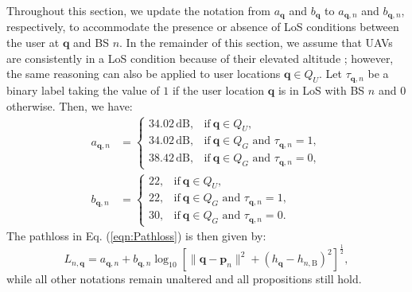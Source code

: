 Throughout this section, we update the notation from $a_{\bm{q}}$ and $b_{\bm{q}}$ to $a_{\bm{q}, n}$ and $b_{\bm{q}, n}$, respectively, to accommodate the presence or absence of LoS conditions between the user at $\bm{q}$ and BS $n$. In the remainder of this section, we assume that UAVs are consistently in a LoS condition because of their elevated altitude \cite{3GPP36777}; however, the same reasoning can also be applied to user locations $\bm{q} \in Q_U$. Let $\tau_{\bm{q}, n}$ be a binary label taking the value of $1$ if the user location $\bm{q}$ is in LoS with BS $n$ and $0$ otherwise. Then, we have: 
\begin{align}\label{a_qn_values}
a_{\bm{q},n} &=
\begin{cases}
34.02\,\textrm{dB}, & \text{if}\ \bm{q}\in Q_U, \\
34.02\,\textrm{dB}, & \text{if}\ \bm{q}\in Q_G \text{ and } \tau_{\bm{q},n} = 1, \\
38.42\,\textrm{dB}, & \text{if}\ \bm{q}\in Q_G \text{ and } \tau_{\bm{q},n} = 0,
\end{cases}
\\
b_{\bm{q},n} &=
\begin{cases}
22, & \text{if}\ \bm{q}\in Q_U, \\
22, & \text{if}\ \bm{q}\in Q_G \text{ and } \tau_{\bm{q},n} = 1, \\
30, & \text{if}\ \bm{q}\in Q_G \text{ and } \tau_{\bm{q},n} = 0.
\end{cases}
\end{align}
The pathloss in Eq. (\ref{eqn:Pathloss}) is then given by:
\begin{equation} \label{eqn:NewPathloss}
L_{n,\bm{q}} = a_{\bm{q}, n} + b_{\bm{q}, n} \log_{10}\left[\| \bm{q} - \bm{p}_n \|^2 + (h_{\bm{q}} -h_{n,\mathrm{B}})^2 \right]^{\frac{1}{2}},
\end{equation}
while all other notations remain unaltered and all propositions still hold.  


